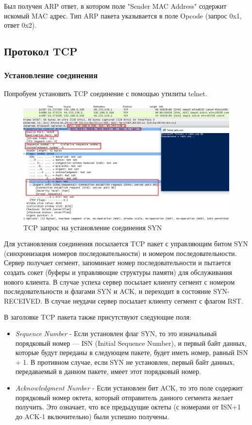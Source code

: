 \documentclass[14pt,a4paper,report]{report}
\begin{document}
Был получен ARP ответ, в котором поле "Sender MAC Address" содержит искомый MAC адрес. Тип ARP пакета указывается в поле Opcode (запрос 0x1, ответ 0x2).

\subsection{Протокол TCP}

\subsubsection{Установление соединения}

Попробуем установить TCP соединение с помощью утилиты telnet.

\begin{figure}[h!]
	\centering
	\includegraphics[scale = 0.63]{images/tcp1.png}
	
	\caption{TCP запрос на установление соединения SYN}
	\label{image:15}
\end{figure}

Для установления соединения посылается TCP пакет с управляющим битом SYN (синхронизация номеров последовательности) и номером последовательности. Сервер получает сегмент, запоминает номер последовательности и пытается создать сокет (буферы и управляющие структуры памяти) для обслуживания нового клиента. В случае успеха сервер посылает клиенту сегмент с номером последовательности и флагами SYN и ACK, и переходит в состояние SYN-RECEIVED. В случае неудачи сервер посылает клиенту сегмент с флагом RST.

В заголовке TCP пакета также присутствуют следующие поля:

\begin{itemize}
	\item \emph{Sequence Number} - Если установлен флаг SYN, то это изначальный порядковый номер — ISN (Initial Sequence Number), и первый байт данных, которые будут переданы в следующем пакете, будет иметь номер, равный ISN + 1. В противном случае, если SYN не установлен, первый байт данных, передаваемый в данном пакете, имеет этот порядковый номер.
	\item \emph{Acknowledgment Number} -  Если установлен бит ACK, то это поле содержит порядковый номер октета, который отправитель данного сегмента желает получить. Это означает, что все предыдущие октеты (с номерами от ISN+1 до ACK-1 включительно) были успешно получены.
\end{itemize}
\end{document}
